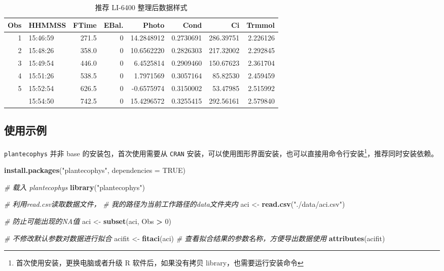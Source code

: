 \documentclass[
]{krantz}
\makeatletter
\newenvironment{Shaded}{\begin{snugshade}}{\end{snugshade}}
\newcommand{\CommentTok}[1]{\textcolor[rgb]{0.56,0.35,0.01}{\textit{#1}}}
\newcommand{\DataTypeTok}[1]{\textcolor[rgb]{0.13,0.29,0.53}{#1}}
\newcommand{\DecValTok}[1]{\textcolor[rgb]{0.00,0.00,0.81}{#1}}
\newcommand{\KeywordTok}[1]{\textcolor[rgb]{0.13,0.29,0.53}{\textbf{#1}}}
\newcommand{\NormalTok}[1]{#1}
\newcommand{\OperatorTok}[1]{\textcolor[rgb]{0.81,0.36,0.00}{\textbf{#1}}}
\newcommand{\OtherTok}[1]{\textcolor[rgb]{0.56,0.35,0.01}{#1}}
\newcommand{\StringTok}[1]{\textcolor[rgb]{0.31,0.60,0.02}{#1}}
\newenvironment{kframe}{%
\medskip{}
\setlength{\fboxsep}{.8em}
 \def\at@end@of@kframe{}%
 \ifinner\ifhmode%
  \def\at@end@of@kframe{\end{minipage}}%
  \begin{minipage}{\columnwidth}%
 \fi\fi%
 \def\FrameCommand##1{\hskip\@totalleftmargin \hskip-\fboxsep
 \colorbox{shadecolor}{##1}\hskip-\fboxsep
     \hskip-\linewidth \hskip-\@totalleftmargin \hskip\columnwidth}%
 \MakeFramed {\advance\hsize-\width
   \@totalleftmargin\z@ \linewidth\hsize
   \@setminipage}}%
 {\par\unskip\endMakeFramed%
 \at@end@of@kframe}
\renewenvironment{Shaded}{\begin{kframe}}{\end{kframe}}
\makeatother
\begin{document}
\begin{longtable}[t]{rlrrrrrr}
\caption{\label{tab:head6400}推荐 LI-6400 整理后数据样式}\\
\toprule
Obs & HHMMSS & FTime & EBal. & Photo & Cond & Ci & Trmmol\\
\midrule
1 & 15:46:59 & 271.5 & 0 & 14.2848912 & 0.2730691 & 286.39751 & 2.226126\\
2 & 15:48:26 & 358.0 & 0 & 10.6562220 & 0.2826303 & 217.32002 & 2.292845\\
3 & 15:49:54 & 446.0 & 0 & 6.4525814 & 0.2909460 & 150.67623 & 2.361704\\
4 & 15:51:26 & 538.5 & 0 & 1.7971569 & 0.3057164 & 85.82530 & 2.459459\\
5 & 15:52:54 & 626.5 & 0 & -0.6575974 & 0.3150002 & 53.47985 & 2.515992\\
\addlinespace
6 & 15:54:50 & 742.5 & 0 & 15.4296572 & 0.3255415 & 292.56161 & 2.579840\\
\bottomrule
\end{longtable}

\hypertarget{fitaci-p}{%
\subsection{使用示例}\label{fitaci-p}}

\texttt{plantecophys} 并非 base 的安装包，首次使用需要从 \texttt{CRAN} 安装，可以使用图形界面安装，也可以直接用命令行安装\footnote{首次使用安装，更换电脑或者升级 R 软件后，如果没有拷贝 library，也需要运行安装命令}，推荐同时安装依赖。

\begin{Shaded}
\begin{Highlighting}[]
\KeywordTok{install.packages}\NormalTok{(}\StringTok{"plantecophys"}\NormalTok{, }\DataTypeTok{dependencies =} \OtherTok{TRUE}\NormalTok{)}
\end{Highlighting}
\end{Shaded}

\begin{Shaded}
\begin{Highlighting}[]
\CommentTok{# 载入 plantecophys }
\KeywordTok{library}\NormalTok{(}\StringTok{"plantecophys"}\NormalTok{)}

\CommentTok{# 利用read.csv读取数据文件，}
\CommentTok{# 我的路径为当前工作路径的data文件夹内}
\NormalTok{aci <-}\StringTok{ }\KeywordTok{read.csv}\NormalTok{(}\StringTok{"./data/aci.csv"}\NormalTok{)}

\CommentTok{# 防止可能出现的NA值}
\NormalTok{aci <-}\StringTok{ }\KeywordTok{subset}\NormalTok{(aci, Obs }\OperatorTok{>}\StringTok{ }\DecValTok{0}\NormalTok{)}

\CommentTok{# 不修改默认参数对数据进行拟合}
\NormalTok{acifit <-}\StringTok{ }\KeywordTok{fitaci}\NormalTok{(aci)}
\CommentTok{# 查看拟合结果的参数名称，方便导出数据使用}
\KeywordTok{attributes}\NormalTok{(acifit)}
\end{Highlighting}
\end{Shaded}
\end{document}
